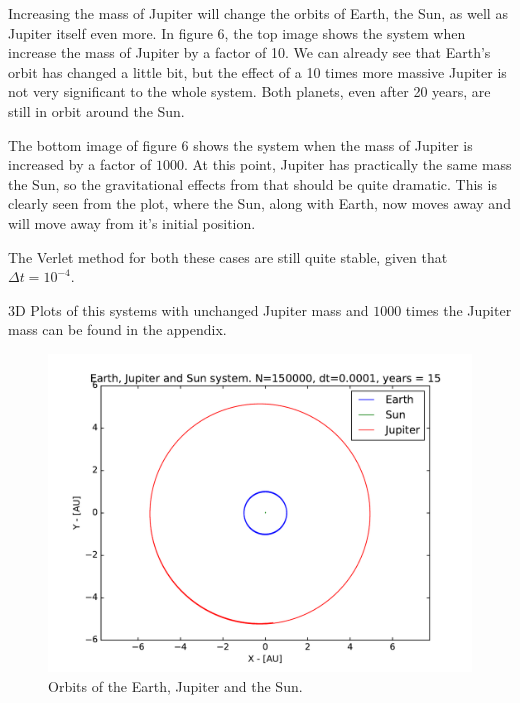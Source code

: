 \documentclass[12pt]{article}
\begin{document}
Increasing the mass of Jupiter will change the orbits of Earth, the Sun, as well as Jupiter itself even more. In figure 6, the top image shows the system when increase the mass of Jupiter by a factor of 10. We can already see that Earth's orbit has changed a little bit, but the effect of a 10 times more massive Jupiter is not very significant to the whole system. Both planets, even after 20 years, are still in orbit around the Sun.

The bottom image of figure 6 shows the system when the mass of Jupiter is increased by a factor of $1000$. At this point, Jupiter has practically the same mass the Sun, so the gravitational effects from that should be quite dramatic. This is clearly seen from the plot, where the Sun, along with Earth, now moves away and will move away from it's initial position. 

The Verlet method for both these cases are still quite stable, given that $\Delta t = 10^{-4}$. 

3D Plots of this systems with unchanged Jupiter mass and $1000$ times the Jupiter mass can be found in the appendix.

\begin{figure}[hbtp]
\centering
\includegraphics[width=\linewidth]{Plots/Earth_Sun_Jupiter.pdf}
\caption{Orbits of the Earth, Jupiter and the Sun.}
\end{figure}
\end{document}
